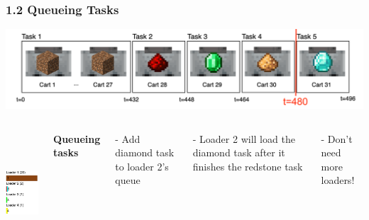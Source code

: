 \documentclass[aspectratio=169]{beamer}
\begin{document}
\begin{frame}
	\frametitle{1.2 Queueing Tasks}
    \includegraphics[width=1\textwidth]{example1.1.png}
    \begin{columns}
    \includegraphics[height=4.5cm]{example1result2.png}

        \textbf{Queueing tasks}

        - Add diamond task to loader 2's queue

        - Loader 2 will load the diamond task after it finishes the redstone task

        - Don't need more loaders!

    \end{columns}

\end{frame}
\end{document}
